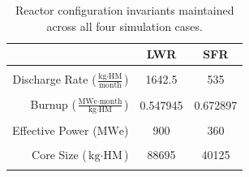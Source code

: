 \documentclass{style}
\begin{document}
\begin{table}
    \centering
    \begin{tabular}{ |r | c c | }
        \hline                       
                                                                             & LWR      & SFR      \\
        \hline                       
                                                                             &          &          \\
        Discharge Rate ($\frac{\text{kg} \cdot \text{HM}}{\text{month}}$)           & 1642.5   & 535      \\
                                                                             &          &          \\
        Burnup  ($\frac{\text{MWe} \cdot \text{month}}{\text{kg} \cdot \text{HM}}$) & 0.547945 & 0.672897 \\
                                                                             &          &          \\
        Effective Power  ($\text{MWe}$)                                      & 900      & 360      \\
                                                                             &          &          \\
        Core Size  ($\text{kg} \cdot \text{HM}$)                                    & 88695    & 40125    \\
                                                                             &          &          \\
        \hline                       
    \end{tabular}
    \captionsetup{justification=centering}
    \caption[Reactor parameter invariants]{
        Reactor configuration invariants maintained across all four
        simulation cases.
    }

    \label{tab:invar}
\end{table}
\end{document}

